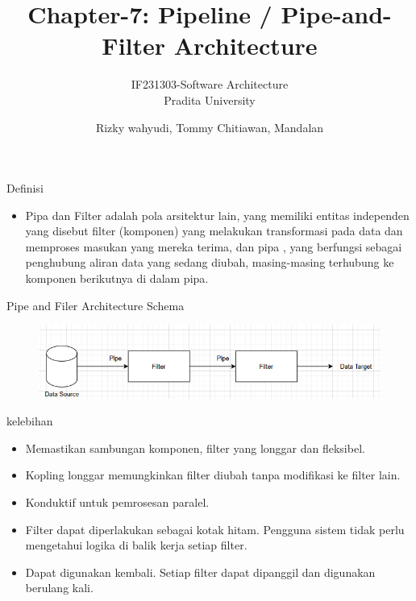 \documentclass{beamer}
\title{Chapter-7: Pipeline / Pipe-and-Filter Architecture}
\subtitle{IF231303-Software Architecture\\Pradita University}
\author{Rizky wahyudi, Tommy Chitiawan, Mandalan}
\begin{document}
	\begin{frame}[plain]
		\maketitle
	\end{frame}

	\begin{frame}{Definisi}
		\begin{itemize}
	\item  Pipa dan Filter adalah pola arsitektur lain, yang memiliki entitas independen yang disebut filter (komponen) yang melakukan transformasi pada data dan memproses masukan yang mereka terima, dan pipa , yang berfungsi sebagai penghubung aliran data yang sedang diubah, masing-masing terhubung ke komponen berikutnya di dalam pipa.
\end{itemize}
\end{frame}

	\begin{frame}{Pipe and Filer Architecture Schema}
		\begin{figure}[h]
		\centering
		\includegraphics{Capture.png}
	\end{figure}
\end{frame}

\begin{frame}{kelebihan}
	\begin{itemize}
	\item Memastikan sambungan komponen, filter yang longgar dan fleksibel.
	\item Kopling longgar memungkinkan filter diubah tanpa modifikasi ke filter lain.
	\item Konduktif untuk pemrosesan paralel.
	\item Filter dapat diperlakukan sebagai kotak hitam. Pengguna sistem tidak perlu mengetahui logika di balik kerja setiap filter.
	\item Dapat digunakan kembali. Setiap filter dapat dipanggil dan digunakan berulang kali.
\end{itemize}
\end{frame}
\end{document}
